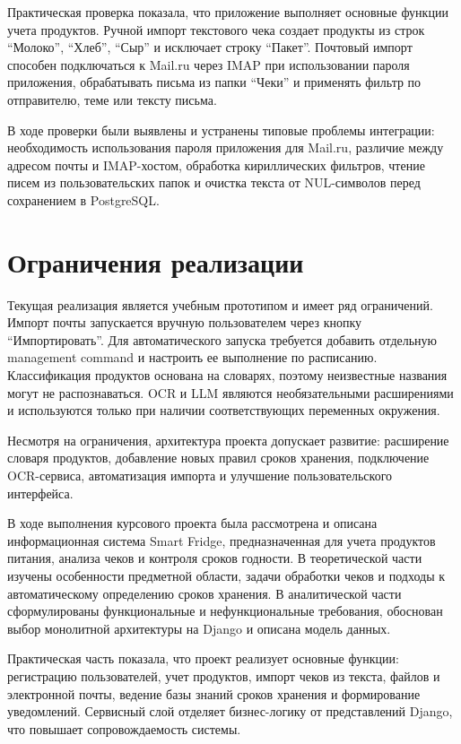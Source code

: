 \documentclass[14pt,a4paper]{extreport}
\begin{document}
Практическая проверка показала, что приложение выполняет основные функции учета продуктов. Ручной импорт текстового чека создает продукты из строк ``Молоко'', ``Хлеб'', ``Сыр'' и исключает строку ``Пакет''. Почтовый импорт способен подключаться к Mail.ru через IMAP при использовании пароля приложения, обрабатывать письма из папки ``Чеки'' и применять фильтр по отправителю, теме или тексту письма.

В ходе проверки были выявлены и устранены типовые проблемы интеграции: необходимость использования пароля приложения для Mail.ru, различие между адресом почты и IMAP-хостом, обработка кириллических фильтров, чтение писем из пользовательских папок и очистка текста от NUL-символов перед сохранением в PostgreSQL.

\section{Ограничения реализации}

Текущая реализация является учебным прототипом и имеет ряд ограничений. Импорт почты запускается вручную пользователем через кнопку ``Импортировать''. Для автоматического запуска требуется добавить отдельную management command и настроить ее выполнение по расписанию. Классификация продуктов основана на словарях, поэтому неизвестные названия могут не распознаваться. OCR и LLM являются необязательными расширениями и используются только при наличии соответствующих переменных окружения.

Несмотря на ограничения, архитектура проекта допускает развитие: расширение словаря продуктов, добавление новых правил сроков хранения, подключение OCR-сервиса, автоматизация импорта и улучшение пользовательского интерфейса.

\newpage
\conclusion

В ходе выполнения курсового проекта была рассмотрена и описана информационная система Smart Fridge, предназначенная для учета продуктов питания, анализа чеков и контроля сроков годности. В теоретической части изучены особенности предметной области, задачи обработки чеков и подходы к автоматическому определению сроков хранения. В аналитической части сформулированы функциональные и нефункциональные требования, обоснован выбор монолитной архитектуры на Django и описана модель данных.

Практическая часть показала, что проект реализует основные функции: регистрацию пользователей, учет продуктов, импорт чеков из текста, файлов и электронной почты, ведение базы знаний сроков хранения и формирование уведомлений. Сервисный слой отделяет бизнес-логику от представлений Django, что повышает сопровождаемость системы.
\end{document}
